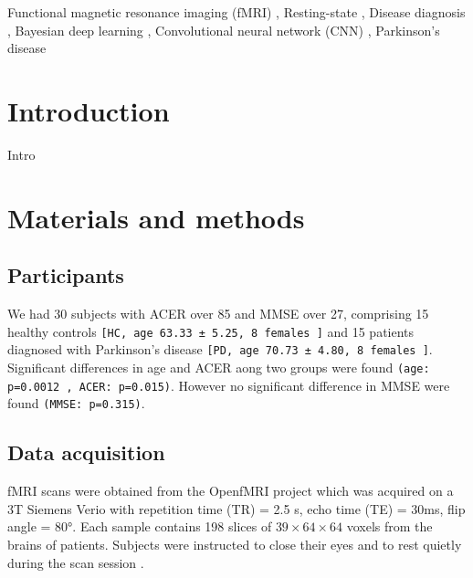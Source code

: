 \documentclass[a4paper,fleqn]{cas-dc}
\begin{document}

\begin{keywords}
Functional magnetic resonance imaging (fMRI) \sep
Resting-state \sep
Disease diagnosis \sep
Bayesian deep learning \sep
Convolutional neural network (CNN) \sep
Parkinson's disease
\end{keywords}


\maketitle

\section{Introduction}

Intro





\section{Materials and methods}
\label{section:materials}





\subsection{Participants}
\label{section:participants}
We had 30 subjects with ACER over 85 and MMSE over 27, comprising 15 healthy controls \texttt{[HC, age 63.33 ± 5.25, 8 females ]}
and 15 patients diagnosed with Parkinson's disease  \texttt{[PD, age 70.73 ± 4.80, 8 females ]}.
Significant differences in age and ACER aong two groups were found \texttt{(age: p=0.0012 , ACER: p=0.015)}. However no significant difference in MMSE were found \texttt{(MMSE: p=0.315)}.

\subsection{Data acquisition}
\label{section:data}
fMRI scans were obtained from the OpenfMRI project which was acquired on a 3T Siemens Verio with repetition time (TR) = 2.5 s, echo time (TE) = 30ms, flip angle = 80°. Each sample contains 198 slices of $39 \times 64 \times 64$ voxels from the brains of patients. Subjects were instructed to close their eyes and to rest quietly during the scan session \cite{OpenFmri}.
\end{document}
